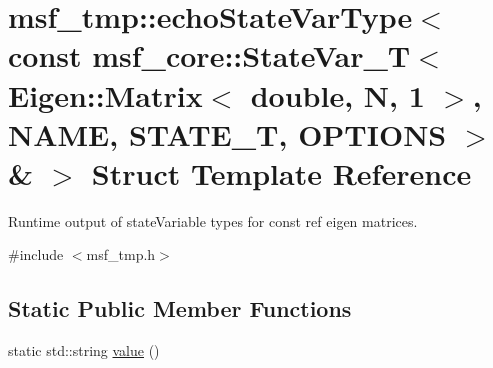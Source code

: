\hypertarget{structmsf__tmp_1_1echoStateVarType_3_01const_01msf__core_1_1StateVar__T_3_01Eigen_1_1Matrix_3_01f7a55ffb559c20f31cb06a2ee67f7cdd}{\section{msf\-\_\-tmp\-:\-:echo\-State\-Var\-Type$<$ const msf\-\_\-core\-:\-:State\-Var\-\_\-\-T$<$ Eigen\-:\-:Matrix$<$ double, N, 1 $>$, N\-A\-M\-E, S\-T\-A\-T\-E\-\_\-\-T, O\-P\-T\-I\-O\-N\-S $>$ \& $>$ Struct Template Reference}
\label{structmsf__tmp_1_1echoStateVarType_3_01const_01msf__core_1_1StateVar__T_3_01Eigen_1_1Matrix_3_01f7a55ffb559c20f31cb06a2ee67f7cdd}
}


Runtime output of state\-Variable types for const ref eigen matrices.  




{\ttfamily \#include $<$msf\-\_\-tmp.\-h$>$}

\subsection*{Static Public Member Functions}
\begin{DoxyCompactItemize}
\item 
static std\-::string \hyperlink{structmsf__tmp_1_1echoStateVarType_3_01const_01msf__core_1_1StateVar__T_3_01Eigen_1_1Matrix_3_01f7a55ffb559c20f31cb06a2ee67f7cdd_a5998e24a4a99711f4e462660e17b669a}{value} ()
\end{DoxyCompactItemize}


